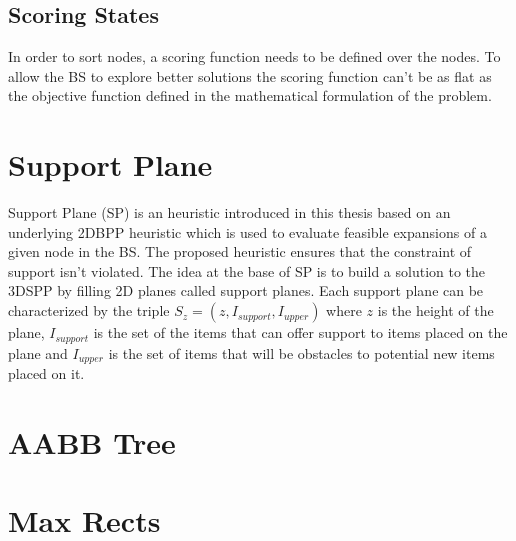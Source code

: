 

\subsection{Scoring States}\label{chapter:heuristics:beamsearch:scoring}
In order to sort nodes, a scoring function needs to be defined over the nodes. 
To allow the BS to explore better solutions the scoring function can't be as flat as the objective function defined in the mathematical formulation of the problem. %

\section{Support Plane}\label{chapter:heuristics:supportplane}
Support Plane (SP) is an heuristic introduced in this thesis based on an underlying 2DBPP heuristic which is used to evaluate feasible expansions of a given node in the BS.
The proposed heuristic ensures that the constraint of support isn't violated.
The idea at the base of SP is to build a solution to the 3DSPP by filling 2D planes called support planes.
Each support plane can be characterized by the triple $S_z = (z, I_{support}, I_{upper})$ where $z$ is the height of the plane, $I_{support}$ is the set of the items that can offer support to items placed on the plane %
and $I_{upper}$ is the set of items that will be obstacles to potential new items placed on it.



\section{AABB Tree}\label{chapter:heuristics:aabbtree}

\section{Max Rects}\label{chapter:heuristics:maxrects}